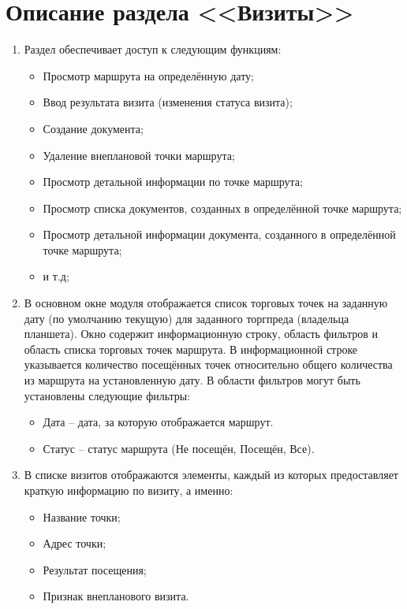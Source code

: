 \section{Описание раздела <<Визиты>>}
\begin{enumerate}[\thesection .1]
\item Раздел обеспечивает доступ к следующим функциям: 
\begin{itemize}
	\item Просмотр маршрута на определённую дату;
	\item Ввод результата визита (изменения статуса визита);
	\item Создание документа;
	\item Удаление внеплановой точки маршрута;
	\item Просмотр детальной информации по точке маршрута;
	\item Просмотр списка документов, созданных в определённой точке маршрута;
	\item Просмотр детальной информации документа, созданного в определённой точке маршрута;
	\item и т.д;
\end{itemize}
\item В основном окне модуля отображается список торговых точек на заданную дату (по умолчанию текущую) для заданного торгпреда (владельца планшета). Окно содержит информационную строку, область фильтров и область списка торговых точек маршрута.
В информационной строке указывается количество посещённых точек относительно общего количества из маршрута на установленную дату. 
В области фильтров могут быть установлены следующие фильтры: 
	\begin{itemize} 
	\item Дата – дата, за которую отображается маршрут.
	\item Статус – статус маршрута (Не посещён, Посещён, Все).
	\end{itemize}		  
\item В списке визитов отображаются элементы, каждый из которых предоставляет краткую информацию по визиту, а именно: 
\begin{itemize}
	\item Название точки;
	\item Адрес точки;
	\item Результат посещения;
	\item Признак внепланового визита.
\end{itemize}		
 	

\end{enumerate}
